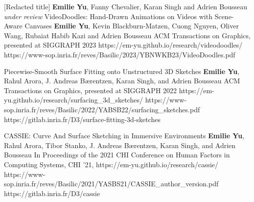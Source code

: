 

\begin{cvpubs}
  \cvpub
    {[Redacted title]} %
    {\textbf{Emilie Yu}, Fanny Chevalier, Karan Singh and Adrien Bousseau} %
    {\emph{under review}} %
    {} %
    {} %
    {} %
  \cvpub
    {VideoDoodles: Hand-Drawn Animations on Videos with Scene-Aware Canvases} %
    {\textbf{Emilie Yu}, Kevin Blackburn-Matzen, Cuong Nguyen, Oliver Wang, Rubaiat Habib Kazi and Adrien Bousseau} %
    {ACM Transactions on Graphics, presented at SIGGRAPH 2023} %
    {https://em-yu.github.io/research/videodoodles/} %
    {https://www-sop.inria.fr/reves/Basilic/2023/YBNWKB23/VideoDoodles.pdf} %
    {} %

  \cvpub
    {Piecewise-Smooth Surface Fitting onto Unstructured 3D Sketches} %
    {\textbf{Emilie Yu}, Rahul Arora, J. Andreas Bærentzen, Karan Singh, and Adrien
    Bousseau} %
    {ACM Transactions on Graphics, presented at SIGGRAPH 2022} %
    {https://em-yu.github.io/research/surfacing_3d_sketches/} %
    {https://www-sop.inria.fr/reves/Basilic/2022/YABSB22/surfacing_sketches.pdf} %
    {https://gitlab.inria.fr/D3/surface-fitting-3d-sketches} %

  \cvpub
    {CASSIE: Curve And Surface Sketching in Immersive Environments} %
    {\textbf{Emilie Yu}, Rahul Arora, Tibor Stanko, J. Andreas Bærentzen, Karan Singh, and Adrien
Bousseau} %
    {In Proceedings of the 2021 CHI Conference on Human
Factors in Computing Systems, CHI ’21, } %
  {https://em-yu.github.io/research/cassie/} %
  {https://www-sop.inria.fr/reves/Basilic/2021/YASBS21/CASSIE_author_version.pdf} %
  {https://gitlab.inria.fr/D3/cassie} %

\end{cvpubs}
